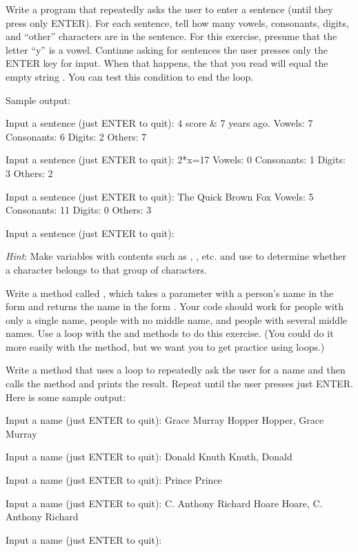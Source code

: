 \begin{exercise}
Write a program that repeatedly asks the user to enter a sentence (until they press only ENTER). For each sentence, tell how many vowels, consonants, digits, and ``other'' characters are in the sentence.  For this exercise, presume that the letter ``y'' is a vowel. Continue asking for sentences the user presses only the ENTER key for input. When that happens, the  that you read will equal the empty string . You can test this condition to end the loop.

Sample output:

\begin{stdout}
Input a sentence (just ENTER to quit): 4 score & 7 years ago.
Vowels:   7  Consonants:  6
Digits:   2  Others:      7

Input a sentence (just ENTER to quit): 2*x=17
Vowels:   0  Consonants:  1
Digits:   3  Others:      2

Input a sentence (just ENTER to quit): The Quick Brown Fox
Vowels:   5  Consonants: 11
Digits:   0  Others:      3

Input a sentence (just ENTER to quit):
\end{stdout}

{\em Hint}: Make  variables with contents such as , , etc. and use  to determine whether a character belongs to that group of characters.

\end{exercise}

\begin{exercise}
Write a method called , which takes a  parameter with a person's name in the form  and returns the name in the form .  Your code should work for people with only a single name, people with no middle name, and people with several middle names.
Use a  loop with the  and  methods to do this exercise. (You could do it more easily with the  method, but we want you to get practice using loops.)

Write a  method that uses a  loop to repeatedly ask the user for a name and then calls the  method and prints the result. Repeat until the user presses just ENTER. Here is some sample output:

\begin{stdout}
Input a name (just ENTER to quit): Grace Murray Hopper
Hopper, Grace Murray

Input a name (just ENTER to quit): Donald Knuth   
Knuth, Donald

Input a name (just ENTER to quit): Prince
Prince

Input a name (just ENTER to quit): C. Anthony Richard Hoare
Hoare, C. Anthony Richard

Input a name (just ENTER to quit): 
\end{stdout}

\end{exercise}


